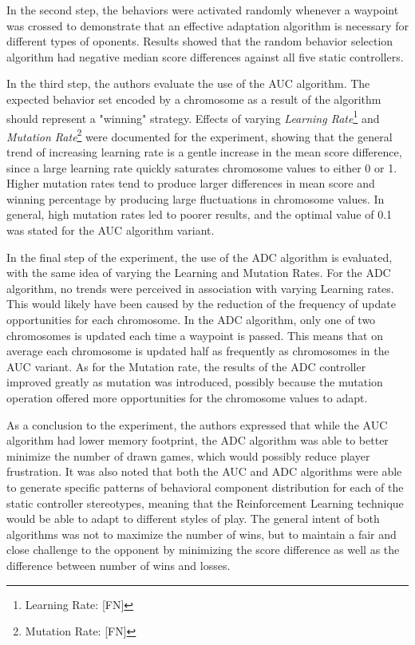 In the second step, the behaviors were activated randomly whenever a waypoint was crossed to demonstrate that an effective adaptation algorithm is necessary for different types of oponents. Results showed that the random behavior selection algorithm had negative median score differences against all five static controllers.

In the third step, the authors evaluate the use of the AUC algorithm. The expected behavior set encoded by a chromosome as a result of the algorithm should represent a "winning" strategy. Effects of varying \emph{Learning Rate}\footnote{Learning Rate: [FN]} and \emph{Mutation Rate}\footnote{Mutation Rate: [FN]} were documented for the experiment, showing that the general trend of increasing learning rate is a gentle increase in the mean score difference, since a large learning rate quickly saturates chromosome values to either 0 or 1. Higher mutation rates tend to produce larger differences in mean score and winning percentage by producing large fluctuations in chromosome values. In general, high mutation rates led to poorer results, and the optimal value of 0.1 was stated for the AUC algorithm variant.

In the final step of the experiment, the use of the ADC algorithm is evaluated, with the same idea of varying the Learning and Mutation Rates. For the ADC algorithm, no trends were perceived in association with varying Learning rates. This would likely have been caused by the reduction of the frequency of update opportunities for each chromosome. In the ADC algorithm, only one of two chromosomes is updated each time a waypoint is passed. This means that on average each chromosome is updated half as frequently as chromosomes in the AUC variant. As for the Mutation rate, the results of the ADC controller improved greatly as mutation was introduced, possibly because the mutation operation offered more opportunities for the chromosome values to adapt.

As a conclusion to the experiment, the authors expressed that while the AUC algorithm had lower memory footprint, the ADC algorithm was able to better minimize the number of drawn games, which would possibly reduce player frustration. It was also noted that both the AUC and ADC algorithms were able to generate specific patterns of behavioral component distribution for each of the static controller stereotypes, meaning that the Reinforcement Learning technique would be able to adapt to different styles of play. The general intent of both algorithms was not to maximize the number of wins, but to maintain a fair and close challenge to the opponent by minimizing the score difference as well as the difference between number of wins and losses.

